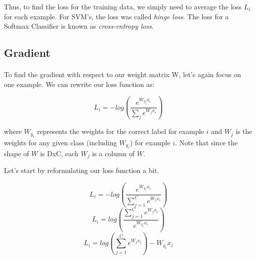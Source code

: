 \documentclass[12pt]{article}
\begin{document}
\noindent Thus, to find the loss for the training data, we simply need 
to average the loss $L_{i}$ for each example. For SVM's, the loss was 
called \emph{hinge loss}. The loss for a Softmax Classifier is known as 
\emph{cross-entropy loss}. 

\subsection{Gradient}

\paragraph{}
To find the gradient with respect to our weight 
matrix W, let's again focus on one example. We can rewrite our loss function as:

\begin{equation}
    L_{i} = -log(\frac{e^{W_{y_{i}}x_{i}}}{\sum_{j} e^{W_{j}x_{i}}}) 
\end{equation}

where $W_{y_{i}}$ represents the weights for the correct label for example $i$ and $W_{j}$ 
is the weights for any given class (including $W_{y_{i}}$) for example $i$. 
Note that since the shape 
of $W$ is DxC, each $W_{j}$ is a column of $W$. 

Let's start by reformulating our loss function a bit.

\begin{equation}
    L_{i} = -log(\frac{e^{W_{y_{i}}x_{i}}}{\sum_{j=1}^C e^{W_{j}x_{i}}}) 
\end{equation}
\begin{equation}
    L_{i} = log(\frac{\sum_{j=1}^C e^{W_{j}x_{i}}}{e^{W_{y_{i}}x_{i}}}) 
\end{equation}
\begin{equation}
    L_{i} = log({\sum_{j=1}^C e^{W_{j}x_{i}}}) - W_{y_{i}}x_{i}
\end{equation}
\end{document}
